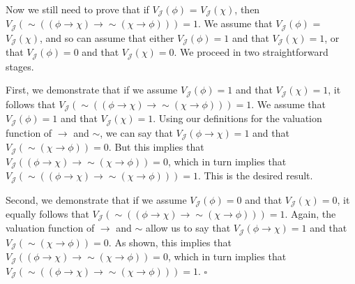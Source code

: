 \documentclass[sloppy, journal, git, bytitle]{humapap}
\begin{document}
Now we still need to prove that if $V\mathcal{_J}(\phi)$ = $V\mathcal{_J}(\chi)$, then $V\mathcal{_J}(\sim((\phi\rightarrow\chi)\rightarrow\sim(\chi\rightarrow\phi)))=1$. We assume that $V\mathcal{_J}(\phi)$ = $V\mathcal{_J}(\chi)$, and so can assume that either $V\mathcal{_J}(\phi)=1$ and that $V\mathcal{_J}(\chi)=1$, or that $V\mathcal{_J}(\phi)=0$ and that $V\mathcal{_J}(\chi)=0$. We proceed in two straightforward stages.  

First, we demonstrate that if we assume $V\mathcal{_J}(\phi)=1$ and that $V\mathcal{_J}(\chi)=1$, it follows that $V\mathcal{_J}(\sim((\phi\rightarrow\chi)\rightarrow\sim(\chi\rightarrow\phi)))=1$. We assume that $V\mathcal{_J}(\phi)=1$ and that $V\mathcal{_J}(\chi)=1$. Using our definitions for the valuation function of $\rightarrow$ and $\sim$, we can say that $V\mathcal{_J}(\phi\rightarrow\chi)=1$ and that $V\mathcal{_J}(\sim(\chi\rightarrow\phi))=0$. But this implies that $V\mathcal{_J}((\phi\rightarrow\chi)\rightarrow\sim(\chi\rightarrow\phi))=0$, which in turn implies that $V\mathcal{_J}(\sim((\phi\rightarrow\chi)\rightarrow\sim(\chi\rightarrow\phi)))=1$. This is the desired result. 

Second, we demonstrate that if we assume $V\mathcal{_J}(\phi)=0$ and that $V\mathcal{_J}(\chi)=0$, it equally follows that $V\mathcal{_J}(\sim((\phi\rightarrow\chi)\rightarrow\sim(\chi\rightarrow\phi)))=1$. Again, the valuation function of $\rightarrow$ and $\sim$ allow us to say that $V\mathcal{_J}(\phi\rightarrow\chi)=1$ and that $V\mathcal{_J}(\sim(\chi\rightarrow\phi))=0$. As shown, this implies that $V\mathcal{_J}((\phi\rightarrow\chi)\rightarrow\sim(\chi\rightarrow\phi))=0$, which in turn implies that $V\mathcal{_J}(\sim((\phi\rightarrow\chi)\rightarrow\sim(\chi\rightarrow\phi)))=1$. $\square$


 




\standardbib
\end{document}
